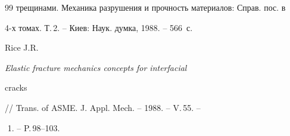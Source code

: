 \begin{thebibliography}{99}
{трещинами}. Механика разрушения и прочность материалов: Справ. пос. в 


4-х томах. Т.\,2. -- Киев: Наук. думка, 1988. -- 566~с. 




Rice J.R. {\em Elastic fracture mechanics concepts for interfacial 


cracks} // Trans. of ASME. J. Appl. Mech. -- 1988. -- V.\,55. -- 


\No\,\,1. -- P.\,98--103. 


 


\end{thebibliography} 


 


\vskip 2cm 


 






 


\label{end} 


 


